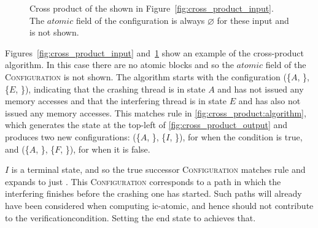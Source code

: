 \begin{figure}
  \caption{Cross product of the {\StateMachines} shown in
    Figure~\ref{fig:cross_product_input}.  The $\mathit{atomic}$ field
    of the configuration is always $\varnothing$ for these input
    {\StateMachines} and is not shown.}
  \label{fig:cross_product_output}
\end{figure}

Figures~\ref{fig:cross_product_input}
and~\ref{fig:cross_product_output} show an example of the
cross-product algorithm.  In this case there are no atomic blocks and
so the $\mathit{atomic}$ field of the \textsc{Configuration} is not
shown.  The algorithm starts with the configuration (\{$A$,
{\false}\}, \{$E$, {\false}\}), indicating that the crashing thread
{\StateMachine} is in state $A$ and has not issued any memory accesses
and that the interfering thread {\StateMachine} is in state $E$ and
has also not issued any memory accesses.  This matches rule
 in \autoref{fig:cross_product:algorithm}, which generates
the state at the top-left of \autoref{fig:cross_product_output} and
produces two new configurations: (\{$A$, {\false}\}, \{$I$,
{\false}\}), for when the condition is true, and (\{$A$, {\false}\},
\{$F$, {\false}\}), for when it is false.

$I$ is a terminal state, and so the true successor
\textsc{Configuration} matches rule  and expands to just
\stUnreached.  This \textsc{Configuration} corresponds to a path in
which the interfering {\StateMachine} finishes before the crashing one
has started.  Such paths will already have been considered when
computing \gls{ic-atomic}, and hence should not contribute to the
\gls{verificationcondition}.  Setting the end state to {\stUnreached}
achieves that.

